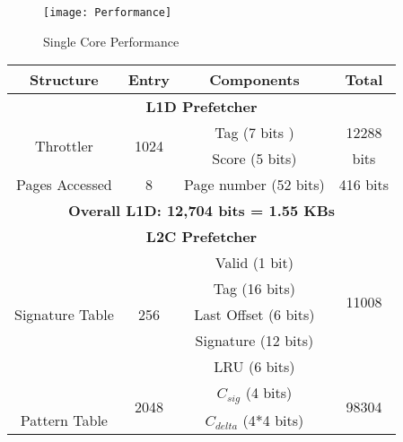 \begin{figure*}[h]
  \begin{center}
  \texttt{[image: Performance]}
  \caption{Single Core Performance}
  \label{fig:perf}
  \end{center}
\end{figure*}



\begin{table}[h]
\begin{adjustwidth}{}{}
    \centering
    \begin{adjustbox}{width=0.72\columnwidth}
    \begin{tabular}{|c|c|c|c|}
    \hline
        \textbf{Structure} &
        \textbf{Entry} &
        \textbf{Components} &
        \textbf{Total} \\
    \hline
	\multicolumn{4}{|c|}{\textbf{L1D Prefetcher}}	\\
    \hline
	\multirow{2}{1.5cm}{Throttler}	& 	\multirow{2}{0.7 cm}{1024} &	Tag (7 bits )	&  12288	\\
					&				   &	Score (5 bits)	&  bits		\\
    \hline
	Pages Accessed			&	8			   & 	Page number (52 bits) 	& 416 bits	\\
    \hline
        \multicolumn{4}{|c|}{\textbf{Overall L1D: 12,704 bits = 1.55 KBs}}\\
    \hline
	\multicolumn{4}{|c|}{\textbf{L2C Prefetcher}}	\\
    \hline
                                            &  \multirow{5}{0.5cm}{256}    & Valid (1 bit)  &             \\
                                             &      & Tag (16 bits)        &  \multirow{2}{0.9cm}{11008}           \\
                            Signature Table  &   & Last Offset (6 bits) &  \multirow{2}{0.5cm}{bits}  \\  
                                             &      & Signature (12 bits)  &             \\
                                             &      & LRU (6 bits)         &             \\
    \hline
                                    &  \multirow{3}{0.5cm}{2048}    & $C_{sig}$ (4 bits)      &\multirow{2}{0.9cm}{98304}               \\
                       Pattern Table         &   & $C_{delta}$ (4*4 bits) &  \multirow{2}{0.5cm}{bits}  \\

\end{tabular}
\end{adjustbox}
\end{adjustwidth}
\end{table}
